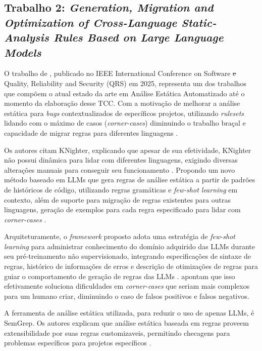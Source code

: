 \documentclass[
    12pt,                %
    openright,           %
    oneside,             %
    a4paper,             %
    english,             %
    brazil               %
]{abntex2}
\newcommand{\antigo}[1]{\sout{#1}}
\begin{document}
\subsection{Trabalho 2: \textit{Generation, Migration and Optimization of Cross-Language Static-Analysis Rules Based on Large Language Models} \cite{hou2025generation}}
\par
O trabalho de , publicado no IEEE International Conference on Software \antigo{e} Quality, Reliability and Security (QRS) em 2025, representa um dos trabalhos que compõem o atual estado da arte em Análise Estática Automatizado até o momento da elaboração desse TCC.
Com a motivação de melhorar a análise estática para \textit{bugs} contextualizados de específicos projetos, utilizando \textit{rulesets} lidando com o máximo de casos (\textit{corner-cases}) diminuindo o trabalho braçal e capacidade de migrar regras para diferentes linguagens \cite{hou2025generation}.
\par
Os autores citam KNighter, explicando que apesar de sua efetividade, KNighter não possui dinâmica para lidar com diferentes linguagens, exigindo diversas alterações manuais para conseguir seu funcionamento \cite{hou2025generation}.
Propondo um novo método baseado em LLMs que gera regras de análise estática a partir de padrões de históricos de código, utilizando regras gramáticas e \textit{few-shot learning} em contexto, além de suporte para migração de regras existentes para outras linguagens, geração de exemplos para cada regra especificado para lidar com \textit{corner-cases} \cite{hou2025generation}.
\par
Arquiteturamente, o \textit{framework} proposto adota uma estratégia de \textit{few-shot learning} para administrar conhecimento do domínio adquirido das LLMs durante seu pré-treinamento não supervisionado, integrando especificações de sintaxe de regras, histórico de informações de erros e descrição de otimizações de regras para guiar o comportamento de geração de regras das LLMs \cite{hou2025generation}.
 apontam que isso efetivamente soluciona dificuldades em \textit{corner-cases} que seriam mais complexos para um humano criar, diminuindo o caso de falsos positivos e falsos negativos.
\par
A ferramenta de análise estática utilizada, para reduzir o uso de apenas LLMs, é SemGrep.
Os autores explicam que análise estática baseada em regras proveem extensibilidade por suas regras customizaveis, permitindo checagens para problemas específicos para projetos específicos \cite{hou2025generation}.
\end{document}
